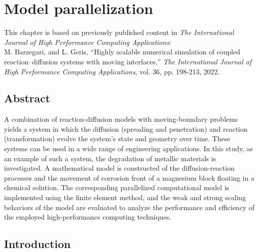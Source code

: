 \chapter{Model parallelization}\label{ch:hpc}


\begin{shaded}
This chapter is based on previously published content in \textit{The International Journal of High Performance Computing Applications}:\\
M. Barzegari, and L. Geris, ``Highly scalable numerical simulation of coupled reaction–diffusion systems with moving interfaces,'' \textit{The International Journal of High Performance Computing Applications}, vol. 36, pp. 198-213, 2022.
\end{shaded}

\section*{Abstract}

A combination of reaction-diffusion models with moving-boundary problems yields a system in which the diffusion (spreading and penetration) and reaction (transformation) evolve the system's state and geometry over time. These systems can be used in a wide range of engineering applications. In this study, as an example of such a system, the degradation of metallic materials is investigated. A mathematical model is constructed of the diffusion-reaction processes and the movement of corrosion front of a magnesium block floating in a chemical solution. The corresponding parallelized computational model is implemented using the finite element method, and the weak and strong scaling behaviors of the model are evaluated to analyze the performance and efficiency of the employed high-performance computing techniques.

\section{Introduction}

